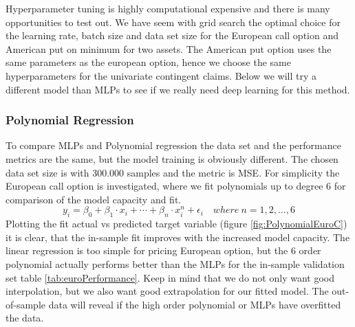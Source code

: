 Hyperparameter tuning is highly computational expensive and there is many opportunities to test out. We have seem with grid search the optimal choice for the learning rate, batch size and data set size for the European call option and American put on minimum for two assets. The American put option uses the same parameters as the european option, hence we choose the same hyperparameters for the univariate contingent claims. Below we will try a different model than MLPs to see if we really need deep learning for this method. 

\subsubsection{Polynomial Regression}
To compare MLPs and Polynomial regression the data set and the performance metrics are the same, but the model training is obviously different. The chosen data set size is with 300.000 samples and the metric is MSE. For simplicity the European call option is investigated, where we fit polynomials up to degree 6 for comparison of the model capacity and fit.  
$$y_i=\beta_0 + \beta_1 \cdot x_i + \cdots + \beta_n \cdot x_i^n + \epsilon_i \quad where \ n=1,2,\ldots,6$$
Plotting the fit actual vs predicted target variable (figure \ref{fig:PolynomialEuroC}) it is clear, that the in-sample fit improves with the increased model capacity. The linear regression is too simple for pricing European option, but the 6 order polynomial actually performs better than the MLPs for the in-sample validation set table \ref{tab:euroPerformance}. Keep in mind that we do not only want good interpolation, but we also want good extrapolation for our fitted model. The out-of-sample data will reveal if the high order polynomial or MLPs have overfitted the data.\\

